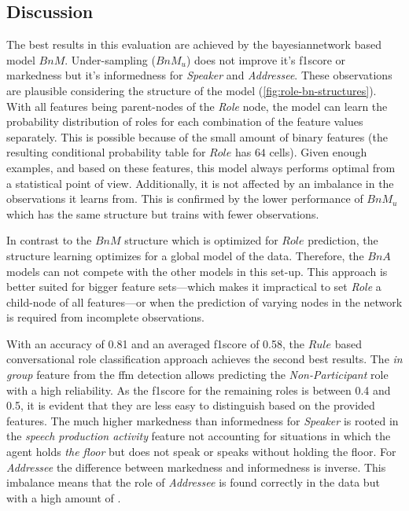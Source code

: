 \subsection{Discussion}

The best results in this evaluation are achieved by the \gls{bayesiannetwork} based model \(BnM\).
Under-sampling (\(BnM_u\)) does not improve it's \gls{f1score} or \gls{markedness} but it's \gls{informedness} for \emph{Speaker} and \emph{Addressee}.
These observations are plausible considering the structure of the model (\cref{fig:role-bn-structures}).
With all features being parent-nodes of the \emph{Role} node, the model can learn the probability distribution of roles for each combination of the feature values separately.
This is possible because of the small amount of binary features (the resulting conditional probability table for \(Role\) has \(64\) cells).
Given enough examples, and based on these features, this model always performs optimal from a statistical point of view.
Additionally, it is not affected by an imbalance in the observations it learns from.
This is confirmed by the lower performance of \(BnM_u\) which has the same structure but trains with fewer observations.

In contrast to the \(BnM\) structure which is optimized for \(Role\) prediction, the structure learning optimizes for a global model of the data.
Therefore, the \(BnA\) models can not compete with the other models in this set-up.
This approach is better suited for bigger feature sets---which makes it impractical to set \emph{Role} a child-node of all features---or when the prediction of varying nodes in the network is required from incomplete observations.

With an \gls{accuracy} of 0.81 and an averaged \gls{f1score} of 0.58, the \(Rule\) based \gls{conversational role} classification approach achieves the second best results.
The \emph{in group} feature from the \gls{ffm} detection allows predicting the \emph{Non-Participant} role with a high reliability.
As the \gls{f1score} for the remaining roles is between  0.4 and 0.5, it is evident that they are less easy to distinguish based on the provided features.
The much higher \gls{markedness} than \gls{informedness} for \emph{Speaker} is rooted in the \emph{speech production activity} feature not accounting for situations in which the agent holds \emph{the floor} but does not speak or speaks without holding the floor.
For \emph{Addressee} the difference between \gls{markedness} and \gls{informedness} is inverse.
This imbalance means that the role of \emph{Addressee} is found correctly in the data but with a high amount of .

